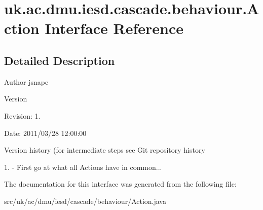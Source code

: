 \hypertarget{interfaceuk_1_1ac_1_1dmu_1_1iesd_1_1cascade_1_1behaviour_1_1_action}{\section{uk.\-ac.\-dmu.\-iesd.\-cascade.\-behaviour.\-Action Interface Reference}
\label{interfaceuk_1_1ac_1_1dmu_1_1iesd_1_1cascade_1_1behaviour_1_1_action}
}


\subsection{Detailed Description}
\begin{DoxyAuthor}{Author}
jsnape 
\end{DoxyAuthor}
\begin{DoxyVersion}{Version}

\end{DoxyVersion}
\begin{DoxyParagraph}{Revision\-:}
1. 
\end{DoxyParagraph}
\begin{DoxyParagraph}{Date\-:}
2011/03/28 12\-:00\-:00 
\end{DoxyParagraph}


Version history (for intermediate steps see Git repository history

1. -\/ First go at what all Actions have in common... 

The documentation for this interface was generated from the following file\-:\begin{DoxyCompactItemize}
\item 
src/uk/ac/dmu/iesd/cascade/behaviour/Action.\-java\end{DoxyCompactItemize}
